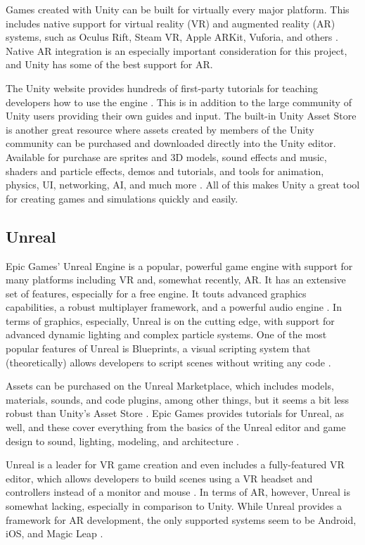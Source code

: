 \documentclass[letterpaper, 10pt, onecolumn, draftclsnofoot]{IEEEtran}
\begin{document}
Games created with Unity can be built for virtually every major platform. This includes native support for virtual reality (VR) and augmented reality (AR) systems, such as Oculus Rift, Steam VR, Apple ARKit, Vuforia, and others \cite{unity-multiplatform}. Native AR integration is an especially important consideration for this project, and Unity has some of the best support for AR.

The Unity website provides hundreds of first-party tutorials for teaching developers how to use the engine \cite{unity-tutorials}. This is in addition to the large community of Unity users providing their own guides and input. The built-in Unity Asset Store is another great resource where assets created by members of the Unity community can be purchased and downloaded directly into the Unity editor. Available for purchase are sprites and 3D models, sound effects and music, shaders and particle effects, demos and tutorials, and tools for animation, physics, UI, networking, AI, and much more \cite{unity-asset-store}. All of this makes Unity a great tool for creating games and simulations quickly and easily.

\subsection{Unreal}
Epic Games' Unreal Engine is a popular, powerful game engine with support for many platforms including VR and, somewhat recently, AR. It has an extensive set of features, especially for a free engine. It touts advanced graphics capabilities, a robust multiplayer framework, and a powerful audio engine \cite{unreal-features}. In terms of graphics, especially, Unreal is on the cutting edge, with support for advanced dynamic lighting and complex particle systems. One of the most popular features of Unreal is Blueprints, a visual scripting system that (theoretically) allows developers to script scenes without writing any code \cite{unreal-blueprints}.

Assets can be purchased on the Unreal Marketplace, which includes models, materials, sounds, and code plugins, among other things, but it seems a bit less robust than Unity's Asset Store \cite{unreal-marketplace}. Epic Games provides tutorials for Unreal, as well, and these cover everything from the basics of the Unreal editor and game design to sound, lighting, modeling, and architecture \cite{unreal-academy}.

Unreal is a leader for VR game creation and even includes a fully-featured VR editor, which allows developers to build scenes using a VR headset and controllers instead of a monitor and mouse \cite{unreal-vr}. In terms of AR, however, Unreal is somewhat lacking, especially in comparison to Unity. While Unreal provides a framework for AR development, the only supported systems seem to be Android, iOS, and Magic Leap \cite{unreal-ar}.
\end{document}
